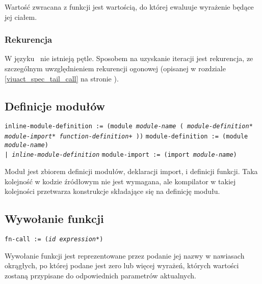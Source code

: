 Wartość zwracana z funkcji jest wartością, do której ewaluuje wyrażenie będące
jej ciałem.

\subsubsection{Rekurencja}

W języku \ViuAct\ nie istnieją pętle. Sposobem na uzyskanie iteracji jest
rekurencja, ze szczególnym uwzględnieniem rekurencji ogonowej (opisanej w
rozdziale \ref{viuact_spec_tail_call} na stronie
\pageref{viuact_spec_tail_call}).

\subsection{Definicje modułów}
\label{viuact_spec_module_definition}

\texttt{inline-module-definition := (module \emph{module-name} (
\newline
\phantom{inline-module-definition := ~}\emph{module-definition}*
\newline
\phantom{inline-module-definition := ~}\emph{module-import}*
\newline
\phantom{inline-module-definition := ~}\emph{function-definition}+
))}
\newline
\texttt{module-definition := (module \emph{module-name}) \\
\phantom{module-definition :}| \emph{inline-module-definition}}
\newline
\texttt{module-import := (import \emph{module-name})}
\newline

Moduł jest zbiorem definicji modułów, deklaracji import, i definicji funkcji.
Taka kolejność w kodzie źródłowym nie jest wymagana, ale kompilator w takiej kolejności przetwarza konstrukcje
składające się na definicję modułu.

\subsection{Wywołanie funkcji}
\label{viuact_spec_fn_call}

\texttt{fn-call := (\emph{id} \emph{expression}*)}
\newline

Wywołanie funkcji jest reprezentowane przez podanie jej nazwy w nawiasach
okrągłych, po której podane jest zero lub więcej wyrażeń, których wartości
zostaną przypisane do odpowiednich parametrów aktualnych.

